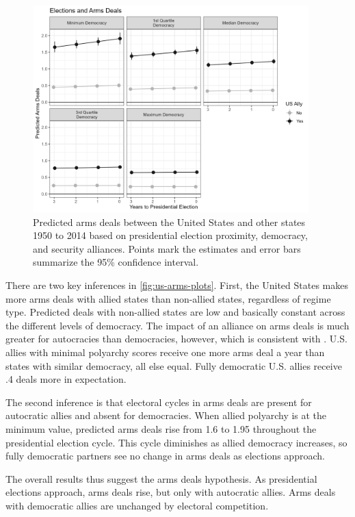 \documentclass[12pt]{article}
\begin{document}
\begin{figure}[htpb]
	\centering
		\includegraphics[width=0.95\textwidth]{../figures/us-arms-plots.png}
	\caption{Predicted arms deals between the United States and other states 1950 to 2014 based on presidential election proximity, democracy, and security alliances. Points mark the estimates and error bars summarize the 95\% confidence interval.}
	\label{fig:us-arms-plots}
\end{figure}


There are two key inferences in \autoref{fig:us-arms-plots}.
First, the United States makes more arms deals with allied states than non-allied states, regardless of regime type. 
Predicted deals with non-allied states are low and basically constant across the different levels of democracy. 
The impact of an alliance on arms deals is much greater for autocracies than democracies, however, which is consistent with \citep{McManusYarhi-Milo2017}. 
U.S. allies with minimal polyarchy scores receive one more arms deal a year than states with similar democracy, all else equal. 
Fully democratic U.S. allies receive .4 deals more in expectation. 


The second inference is that electoral cycles in arms deals are present for autocratic allies and absent for democracies.
When allied polyarchy is at the minimum value, predicted arms deals rise from 1.6 to 1.95 throughout the presidential election cycle. 
This cycle diminishes as allied democracy increases, so fully democratic partners see no change in arms deals as elections approach.  


The overall results thus suggest the arms deals hypothesis. 
As presidential elections approach, arms deals rise, but only with autocratic allies. 
Arms deals with democratic allies are unchanged by electoral competition.
\end{document}
